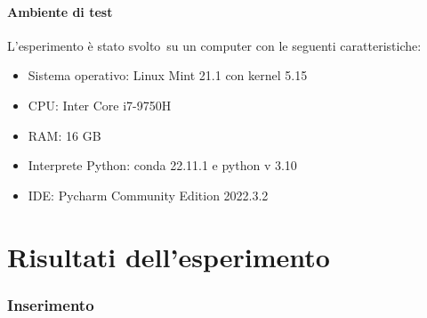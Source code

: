 \documentclass[
]{article}
\begin{document}
\hypertarget{ambiente-di-test}{%
\paragraph{Ambiente di test}\label{ambiente-di-test}}

L'esperimento è stato svolto~su un computer con le seguenti
caratteristiche:

\begin{itemize}
\item
  Sistema operativo: Linux Mint 21.1 con kernel 5.15
\item
  CPU: Inter Core i7-9750H
\item
  RAM: 16 GB
\item
  Interprete Python: conda 22.11.1 e python v 3.10
\item
  IDE: Pycharm Community Edition 2022.3.2
\end{itemize}

\hypertarget{risultati-dellesperimento}{%
\section{Risultati dell'esperimento}\label{risultati-dellesperimento}}

\hypertarget{inserimento}{%
\subsubsection{Inserimento}\label{inserimento}}
\end{document}
